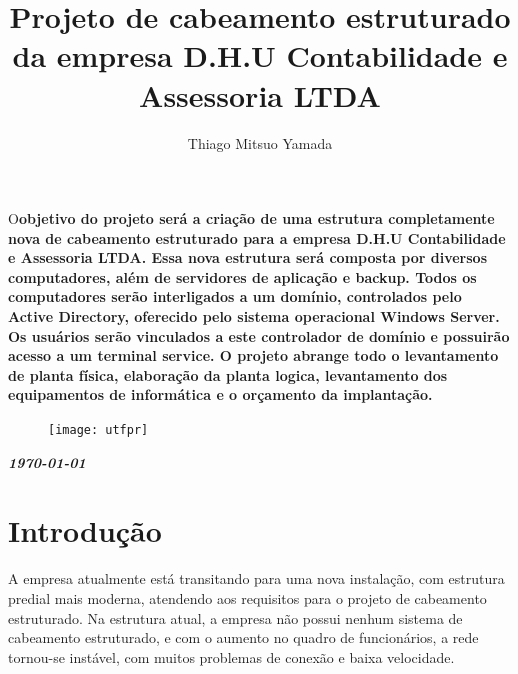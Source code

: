 \documentclass[	DIV=calc,%
							paper=a4,%
							fontsize=12pt,%
							onecolumn]{scrartcl}	 					%
\title{Projeto de cabeamento estruturado da empresa D.H.U Contabilidade e Assessoria LTDA}					%
\author{Thiago Mitsuo Yamada}  	%
\date{}																				%
\newcommand{\initial}[1]{%
     \lettrine[lines=3,lhang=0.3,nindent=0em]{
     				\color{DarkGoldenrod}
     				{\textsf{#1}}}{}}
\begin{document}
\maketitle
\thispagestyle{fancy} 	
\thispagestyle{empty}		%




\initial{O}\textbf{objetivo do projeto será a criação de uma estrutura completamente nova de cabeamento estruturado para a empresa D.H.U Contabilidade e Assessoria LTDA. Essa nova estrutura será composta por diversos computadores, além de servidores de aplicação e backup. Todos os computadores serão interligados a um domínio, controlados pelo Active Directory, oferecido pelo sistema operacional Windows Server. Os usuários serão vinculados a este controlador de domínio e possuirão acesso a um terminal service. O projeto abrange todo o levantamento de planta física, elaboração da planta logica, levantamento dos equipamentos de informática e o orçamento da implantação.  }

\begin{figure}
	\centering
	\texttt{[image: utfpr]}
\end{figure}

\vspace{1cm}
\centerline{\textit{\textbf{\today}}}

\clearpage
    \renewcommand*\listfigurename{Lista de figuras}
\listoffigures

\renewcommand*\listtablename{Lista de tabelas}
\listoftables




\clearpage
\renewcommand{\contentsname}{Sumário}
\tableofcontents
\clearpage

\section{Introdução}
A empresa atualmente está transitando para uma nova instalação, com estrutura predial mais moderna, atendendo aos requisitos para o projeto de cabeamento estruturado. Na estrutura atual, a empresa não possui nenhum sistema de cabeamento estruturado, e com o aumento no quadro de funcionários, a rede tornou-se instável, com muitos problemas de conexão e baixa velocidade.
\end{document}
